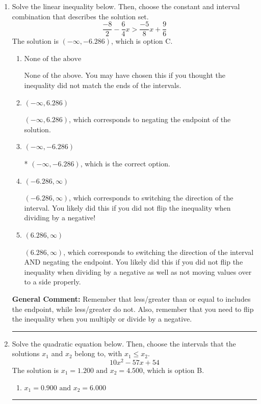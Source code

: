 \documentclass{extbook}[14pt]
\newcommand{\litem}[1]{\item #1

\rule{\textwidth}{0.4pt}}
\begin{document}
\begin{enumerate}
{\begin{enumerate}[label=\Alph*.]
* $[0.214, \infty)$, which is the correct option.
\end{enumerate}

\textbf{General Comment:} Remember that less/greater than or equal to includes the endpoint, while less/greater do not. Also, remember that you need to flip the inequality when you multiply or divide by a negative.
}
\litem{
Solve the linear inequality below. Then, choose the constant and interval combination that describes the solution set.
\[ \frac{-8}{2} - \frac{6}{4} x > \frac{-5}{8} x + \frac{9}{6} \]The solution is \( (-\infty, -6.286) \), which is option C.\begin{enumerate}[label=\Alph*.]
\item \( \text{None of the above} \)

None of the above. You may have chosen this if you thought the inequality did not match the ends of the intervals.
\item \( (-\infty, 6.286) \)

 $(-\infty, 6.286)$, which corresponds to negating the endpoint of the solution.
\item \( (-\infty, -6.286) \)

* $(-\infty, -6.286)$, which is the correct option.
\item \( (-6.286, \infty) \)

 $(-6.286, \infty)$, which corresponds to switching the direction of the interval. You likely did this if you did not flip the inequality when dividing by a negative!
\item \( (6.286, \infty) \)

 $(6.286, \infty)$, which corresponds to switching the direction of the interval AND negating the endpoint. You likely did this if you did not flip the inequality when dividing by a negative as well as not moving values over to a side properly.
\end{enumerate}

\textbf{General Comment:} Remember that less/greater than or equal to includes the endpoint, while less/greater do not. Also, remember that you need to flip the inequality when you multiply or divide by a negative.
}
\litem{
Solve the quadratic equation below. Then, choose the intervals that the solutions $x_1$ and $x_2$ belong to, with $x_1 \leq x_2$.
\[ 10x^{2} -57 x + 54 \]The solution is \( x_1 = 1.200 \text{ and } x_2 = 4.500 \), which is option B.\begin{enumerate}[label=\Alph*.]
\item \( x_1 = 0.900 \text{ and } x_2 = 6.000 \)


\end{enumerate}}
\end{enumerate}
\end{document}
